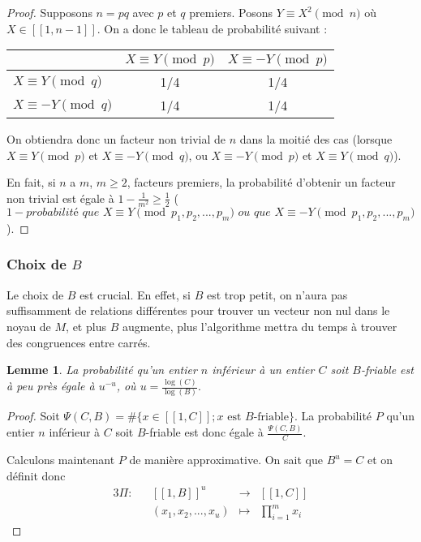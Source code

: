 \documentclass[french, 12pt, titlepage]{article}
\newtheorem{lemme}{Lemme}
\begin{document}
\begin{proof}
Supposons $n = pq$ avec $p$ et $q$ premiers. Posons $Y \equiv X^2 \pmod n$
où $X \in [\![1, n-1]\!].$ On a donc le tableau de probabilité
suivant : 
\begin{center}
\begin{tabular}{l|c|c}
 & $X \equiv Y \pmod p$ & $X \equiv -Y \pmod p$ \\
\hline
$X \equiv Y \pmod q$ & 1/4 & 1/4 \\
\hline
$X \equiv -Y \pmod q$ & 1/4 & 1/4 \\
\end{tabular}
\end{center}
On obtiendra donc un facteur non trivial de $n$ dans la moitié des cas
(lorsque $X \equiv Y \pmod p$ et $X \equiv -Y \pmod q$, ou $X \equiv
-Y \pmod p$ et $X \equiv Y \pmod q$).

En fait, si $n$ a $m$, $m \geq 2$, facteurs premiers, la probabilité d'obtenir un
facteur non trivial est égale à $1 - \frac{1}{m^2} \geq \frac{1}{2}$
($1 - \textit{probabilité que } X \equiv Y \pmod {p_1, p_2, ..., p_m}
\textit{ ou que } X
\equiv -Y \pmod {p_1, p_2, ..., p_m}$).
\end{proof}

\subsubsection{Choix de $B$}

Le choix de $B$ est crucial. En effet, si $B$ est trop petit, on
n'aura pas suffisamment de relations différentes pour trouver un
vecteur non nul dans le noyau de $M$, et plus $B$ augmente, plus
l'algorithme mettra du temps à trouver des congruences entre carrés. 

\begin{lemme}
La probabilité qu'un entier $n$ inférieur à un entier $C$ soit
$B$-friable est à peu près égale à $u^{-u}$, où $u = \frac{\log(C)}{\log(B)}.$
\end{lemme}

\begin{proof}

Soit $\Psi(C, B) = \#\{x \in [\![1, C]\!]; x \text{ est }
B\text{-friable}\}.$ La probabilité $P$ qu'un entier $n$ inférieur
à $C$ soit $B$-friable est donc égale à $\frac{\Psi(C, B)}{C}.$

Calculons maintenant $P$ de manière approximative. On sait que $B^u =
C$ et on définit donc 
\begin{alignat*}{3}
\Pi : && [\![1, B]\!]^u & \to & [\![1, C]\!] \\
&& (x_1, x_2, ..., x_u) & \mapsto & \prod\limits_{i = 1}^m x_i
\end{alignat*}


\end{proof}
\end{document}
